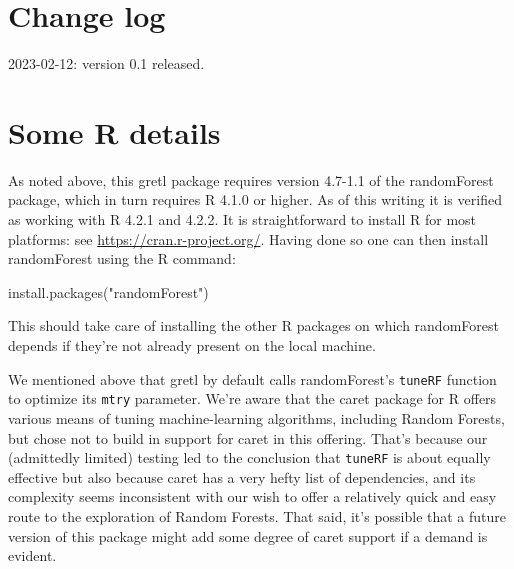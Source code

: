\documentclass{article}
\begin{document}
\section{Change log}

2023-02-12: version 0.1 released.

\section{Some \textsf{R} details}
\label{sec:Rdetails}

As noted above, this gretl package requires version 4.7-1.1 of the
\textsf{randomForest} package, which in turn requires \textsf{R} 4.1.0
or higher. As of this writing it is verified as working with
\textsf{R} 4.2.1 and 4.2.2. It is straightforward to install
\textsf{R} for most platforms: see
\url{https://cran.r-project.org/}. Having done so one can then install
\textsf{randomForest} using the \textsf{R} command:
\begin{code}
install.packages("randomForest")
\end{code}
This should take care of installing the other \textsf{R} packages on
which \textsf{randomForest} depends if they're not already present on
the local machine.

We mentioned above that gretl by default calls \textsf{randomForest}'s
\texttt{tuneRF} function to optimize its \texttt{mtry}
parameter. We're aware that the \textsf{caret} package for \textsf{R}
offers various means of tuning machine-learning algorithms, including
Random Forests, but chose not to build in support for \textsf{caret}
in this offering. That's because our (admittedly limited) testing led
to the conclusion that \texttt{tuneRF} is about equally effective but
also because \textsf{caret} has a very hefty list of dependencies, and
its complexity seems inconsistent with our wish to offer a relatively
quick and easy route to the exploration of Random Forests. That said,
it's possible that a future version of this package might add some
degree of \textsf{caret} support if a demand is evident.
\end{document}
